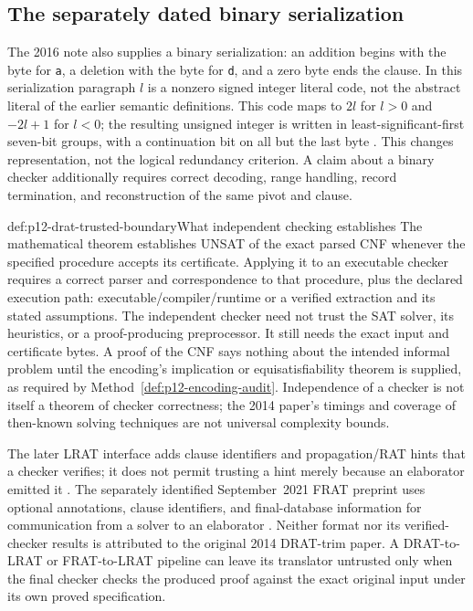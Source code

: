 \subsection{The separately dated binary serialization}
\label{sec:p12-drat-binary-2016}

The 2016 note also supplies a binary serialization: an addition begins with
the byte for \texttt{a}, a deletion with the byte for \texttt{d}, and a zero
byte ends the clause.  In this serialization paragraph \(l\) is a nonzero
signed integer literal code, not the abstract literal of the earlier semantic
definitions.  This code maps to \(2l\) for
\(l>0\) and \(-2l+1\) for \(l<0\); the resulting unsigned integer is
written in least-significant-first seven-bit groups, with a continuation bit
on all but the last byte \cite[Sec.~1]{Heule2016DRATFormatV1}.  This changes
representation, not the logical redundancy criterion.  A claim about a binary
checker additionally requires correct decoding, range handling, record
termination, and reconstruction of the same pivot and clause.

\begin{proofboundary}{def:p12-drat-trusted-boundary}{What independent checking establishes}
The mathematical theorem establishes UNSAT of the exact parsed CNF whenever
the specified procedure accepts its certificate.  Applying it to an executable
checker requires a correct parser and correspondence to that procedure, plus
the declared execution path: executable/compiler/runtime or a verified
extraction and its stated assumptions.  The independent checker need not trust
the SAT solver, its heuristics, or a proof-producing preprocessor.  It still
needs the exact input and certificate bytes.  A proof of the CNF says nothing
about the intended informal problem until the encoding's implication or
equisatisfiability theorem is supplied, as required by
Method~\ref{def:p12-encoding-audit}.  Independence of a checker is not itself
a theorem of checker correctness; the 2014 paper's timings and coverage of
then-known solving techniques are not universal complexity bounds.
\end{proofboundary}

The later LRAT interface adds clause identifiers and propagation/RAT hints
that a checker verifies; it does not permit trusting a hint merely because an
elaborator emitted it \cite[Secs.~1, 3]{CruzFilipeEtAl2016LRATV1}.  The
separately identified September~2021 FRAT preprint uses optional annotations,
clause identifiers, and final-database information for communication from a
solver to an elaborator \cite[Secs.~1--2]{BaekCarneiroHeule2021FRATV1}.
Neither format nor its verified-checker results is attributed to the original
2014 DRAT-trim paper.  A DRAT-to-LRAT or FRAT-to-LRAT pipeline can leave its
translator untrusted only when the final checker checks the produced proof
against the exact original input under its own proved specification.

